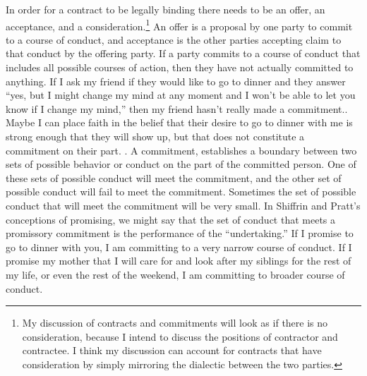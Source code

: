In order for a contract to be legally binding there needs to be an
offer, an acceptance, and a consideration.\footnote{My discussion of
  contracts and commitments will look as if there is no consideration,
  because I intend to discuss the positions of contractor and
  contractee. I think my discussion can account for contracts that have
  consideration by simply mirroring the dialectic between the two
  parties.} An offer is a proposal by one party to commit to a course of
conduct, and acceptance is the other parties accepting claim to that
conduct by the offering party. If a party commits to a course of conduct
that includes all possible courses of action, then they have not
actually committed to anything. If I ask my friend if they would like to
go to dinner and they answer ``yes, but I might change my mind at any
moment and I won't be able to let you know if I change my mind,'' then
my friend hasn't really made a commitment.. Maybe I can place faith in
the belief that their desire to go to dinner with me is strong enough
that they will show up, but that does not constitute a commitment on
their part. . A commitment, establishes a boundary between two sets of
possible behavior or conduct on the part of the committed person. One of
these sets of possible conduct will meet the commitment, and the other
set of possible conduct will fail to meet the commitment. Sometimes the
set of possible conduct that will meet the commitment will be very
small. In Shiffrin and Pratt's conceptions of promising, we might say
that the set of conduct that meets a promissory commitment is the
performance of the ``undertaking.'' If I promise to go to dinner with
you, I am committing to a very narrow course of conduct. If I promise my
mother that I will care for and look after my siblings for the rest of
my life, or even the rest of the weekend, I am committing to broader
course of conduct.

